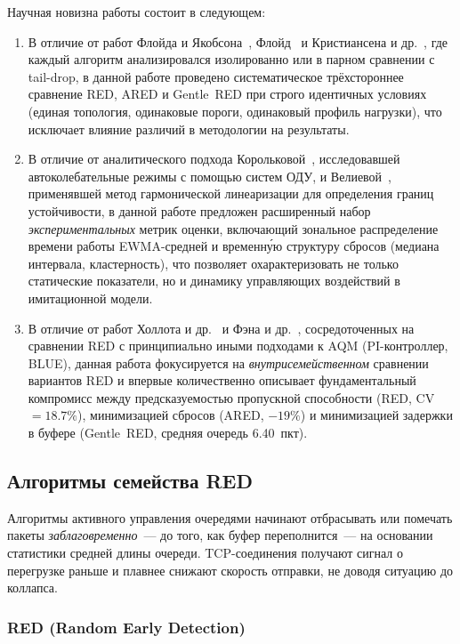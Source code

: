 \documentclass[12pt,a4paper]{article}
\begin{document}
Научная новизна работы состоит в следующем:
\begin{enumerate}
  \item В отличие от работ Флойда и Якобсона~\cite{floyd1993}, Флойд~\cite{floyd2000, floyd2001} и Кристиансена и др.~\cite{christiansen2001}, где каждый алгоритм анализировался изолированно или в парном сравнении с tail-drop, в данной работе проведено систематическое трёхстороннее сравнение RED, ARED и Gentle~RED при строго идентичных условиях (единая топология, одинаковые пороги, одинаковый профиль нагрузки), что исключает влияние различий в методологии на результаты.
  \item В отличие от аналитического подхода Королько\-вой~\cite{korolkova2010}, исследовавшей автоколебательные режимы с помощью систем ОДУ, и Велиевой~\cite{velieva2019}, применявшей метод гармонической линеаризации для определения границ устойчивости, в данной работе предложен расширенный набор \textit{экспериментальных} метрик оценки, включающий зональное распределение времени работы EWMA-средней и временн\'{у}ю структуру сбросов (медиана интервала, кластерность), что позволяет охарактеризовать не только статические показатели, но и динамику управляющих воздействий в имитационной модели.
  \item В отличие от работ Холлота и др.~\cite{hollot2001} и Фэна и др.~\cite{feng2002}, сосредоточенных на сравнении RED с принципиально иными подходами к AQM (PI-контроллер, BLUE), данная работа фокусируется на \textit{внутрисемейственном} сравнении вариантов RED и впервые количественно описывает фундаментальный компромисс между предсказуемостью пропускной способности (RED, CV~$= 18.7\%$), минимизацией сбросов (ARED, $-19\%$) и минимизацией задержки в буфере (Gentle~RED, средняя очередь 6.40~пкт).
\end{enumerate}

\subsection{Алгоритмы семейства RED}

Алгоритмы активного управления очередями начинают отбрасывать или помечать пакеты \textit{заблаговременно}~--- до того, как буфер переполнится~--- на основании статистики средней длины очереди. TCP-соединения получают сигнал о перегрузке раньше и плавнее снижают скорость отправки, не доводя ситуацию до коллапса.

\subsubsection{RED (Random Early Detection)}
\end{document}
